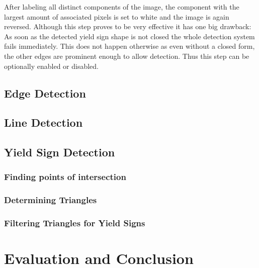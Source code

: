 \documentclass{report}
\begin{document}
After labeling all distinct components of the image, the component
with the largest amount of associated pixels is set to white and the
image is again reversed. Although this step proves to be very
effective it has one big drawback: As soon as the detected yield sign
shape is not closed the whole detection system fails immediately. This
does not happen otherwise as even without a closed form, the other
edges are prominent enough to allow detection. Thus this step can be
optionally enabled or disabled.

{\color{red}{Picture examples}}


\section{Edge Detection}
{\color{red}{To be written}}


\section{Line Detection}
{\color{red}{To be written}}


\section{Yield Sign Detection}
{\color{red}{To be written}}


\subsection{Finding points of intersection}




\subsection{Determining Triangles}
{\color{red}{To be written}}


\subsection{Filtering Triangles for Yield Signs}
{\color{red}{To be written}}


\pagebreak
\chapter{Evaluation and Conclusion}
\end{document}
